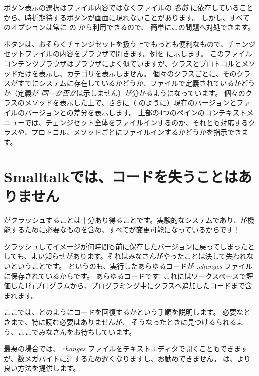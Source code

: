 \documentclass[a4paper,10pt,twoside]{book}
\begin{document}
ボタン表示の選択はファイル内容ではなくファイルの \emph{名前} に依存していることから、時折期待するボタンが画面に現れないことがあります。
しかし、すべてのオプションは常に \actclick の  から利用できるので、
簡単にこの問題へ対処できます。

 ボタンは、おそらくチェンジセットを扱う上でもっとも便利なもので、チェンジセットファイルの内容をブラウザで開きます。例を  に示します。
このファイルコンテンツブラウザはブラウザによく似ていますが、クラスとプロトコルとメソッドだけを表示し、カテゴリを表示しません。
個々のクラスごとに、そのクラスがすでにシステムに存在しているかどうか、ファイルで定義されているかどうか（定義が \emph{同一か否か}は示しません）が分かるようになっています。
個々のクラスのメソッドを表示した上で、さらに（ のように）現在のバージョンとファイルのバージョンとの差分を表示します。
上部の4つのペインのコンテキストメニューでは、チェンジセット全体をファイルインするのか、それとも対応するクラスや、プロトコル、メソッドごとにファイルインするかどうかを指示できます。

\section{Smalltalkでは、コードを失うことはありません}

\pharo がクラッシュすることは十分あり得ることです。実験的なシステムであり、\pharo が機能するために必要なものを含め、すべてが変更可能になっているからです！


クラッシュしてイメージが何時間も前に保存したバージョンに戻ってしまったとしても、よい知らせがあります。それはみなさんがやったことは決して失われないということです。
というのも、実行したあらゆるコードが \emph{.changes} ファイルに保存されているからです。
あらゆるコードです!
これにはワークスペースで評価した1行プログラムから、プログラミング中にクラスへ追加したコードまで含まれます。

ここでは、どのようにコードを回復するかという手順を説明します。
必要なときまで、特に読む必要はありませんが、
そうなったときに見つけるられるよう、ここでみなさんをお待ちしています。

最悪の場合では、\emph{.changes} ファイルをテキストエディタで開くこともできますが、数メガバイトに達するため遅くなりますし、お勧めできません。
\pharo は、より良い方法を提供します。
\end{document}
